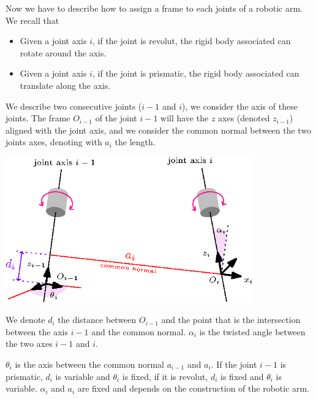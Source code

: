 \documentclass[10pt, letterpaper]{report}
\begin{document}
Now we have to describe how to assign a frame to each joints of a robotic arm. We recall that\begin{itemize}
    \item Given a joint axis $i$, if the joint is revolut, the rigid body associated can rotate around the axis. 
    \item Given a joint axis $i$, if the joint is prismatic, the rigid body associated can translate along the axis. 
\end{itemize}
We describe two consecutive joints ($i-1$ and $i$), we consider the axis of these joints. The frame $O_{i-1}$ of the joint $i-1$ will have the $z$ axes (denoted $z_{i-1}$) aligned with the joint axis, and we consider the common normal between the two joints axes, denoting with $a_i$ the length.
\begin{center}
    \includegraphics[width=0.8\textwidth ]{images/DH_frames.eps}
\end{center}
We denote $d_i$ the distance between $O_{i-1}$ and the point that is the intersection between the axis $i-1$ and the common normal. $\alpha_i$ is the twisted angle between the two axes $i-1$ and $i$.\bigskip 

$\theta_i$ is the axis between the common normal $a_{i-1}$ and $a_i$. If the joint $i-1$ is prismatic, $d_i$ is variable and $\theta_i$ is fixed, if it is revolut, $d_i$ is fixed and $\theta_i$ is variable. $\alpha_i$ and $a_i$ are fixed and depends on the construction of the robotic arm. \bigskip 
\end{document}
